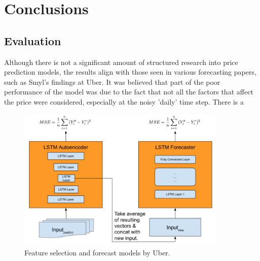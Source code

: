 \documentclass[10pt,onecolumn,letterpaper]{article}
\begin{document}
\section{Conclusions}

\subsection{Evaluation} \label{evaluation}

Although there is not a significant amount of structured research into price prediction models, the results align with those seen in various forecasting papers, such as Smyl's findings at Uber. It was believed that part of the poor performance of the model was due to the fact that not all the factors that affect the price were considered, especially at the noisy 'daily' time step. There is a 

\begin{figure}[!hbt!]
\centering
\includegraphics[width=10cm]{uber_architecture}
\caption{Feature selection and forecast models by Uber.}
\label{data_structuring}
\end{figure}
\end{document}
